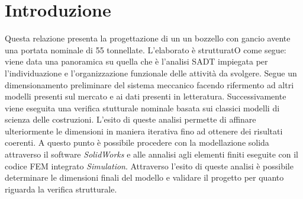 \section{Introduzione}
Questa relazione presenta la progettazione di un un bozzello con gancio avente una portata nominale di 55 tonnellate. 
L'elaborato è strutturatO come segue: viene data una panoramica su quella che è l'analisi SADT impiegata per l'individuazione e l'organizzazione funzionale delle attività da svolgere. 
Segue un dimensionamento preliminare del sistema meccanico facendo rifermento ad altri modelli presenti sul mercato e ai dati presenti in letteratura. 
Successivamente viene eseguita una verifica stutturale nominale basata sui classici modelli di scienza delle costruzioni. 
L'esito di queste analisi permette di affinare ulteriormente le dimensioni in maniera iterativa fino ad ottenere dei risultati coerenti. 
A questo punto è possibile procedere con la modellazione solida attraverso il software \textit{SolidWorks} e alle annalisi agli elementi finiti eseguite con il codice FEM integrato \textit{Simulation}. 
Attraverso l'esito di queste analisi è possibile determinare le dimensioni finali del modello e validare il progetto per quanto riguarda la verifica strutturale. 